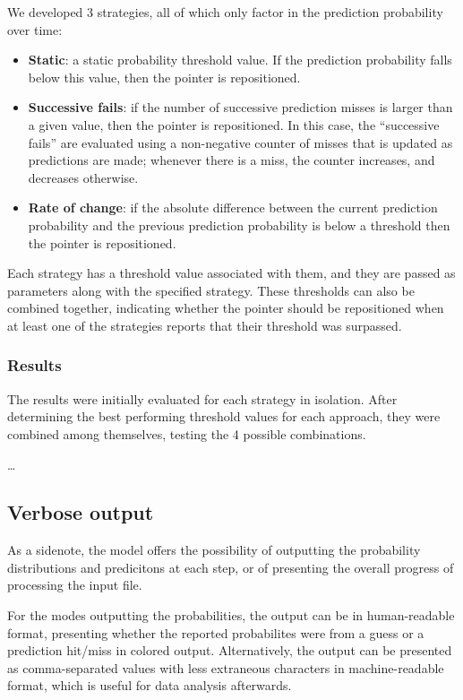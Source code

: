 \documentclass{article}
\begin{document}
We developed 3 strategies, all of which only factor in the prediction probability over time:
\begin{itemize}
    \item \textbf{Static}: a static probability threshold value. If the prediction probability falls below this value, then the pointer is repositioned.
    \item \textbf{Successive fails}: if the number of successive prediction misses is larger than a given value, then the pointer is repositioned.
    In this case, the ``successive fails'' are evaluated using a non-negative counter of misses that is updated as predictions are made; whenever there is a miss, the counter increases, and decreases otherwise.
    \item \textbf{Rate of change}: if the absolute difference between the current prediction probability and the previous prediction probability is below a threshold then the pointer is repositioned.
\end{itemize}

Each strategy has a threshold value associated with them, and they are passed as parameters along with the specified strategy.
These thresholds can also be combined together, indicating whether the pointer should be repositioned when at least one of the strategies reports that their threshold was surpassed.

\subsubsection{Results}

The results were initially evaluated for each strategy in isolation.
After determining the best performing threshold values for each approach, they were combined among themselves, testing the 4 possible combinations.

\dots

\subsection{Verbose output}

As a sidenote, the model offers the possibility of outputting the probability distributions and predicitons at each step, or of presenting the overall progress of processing the input file.

For the modes outputting the probabilities, the output can be in human-readable format, presenting whether the reported probabilites were from a guess or a prediction hit/miss in colored output.
Alternatively, the output can be presented as comma-separated values with less extraneous characters in machine-readable format, which is useful for data analysis afterwards.
\end{document}
